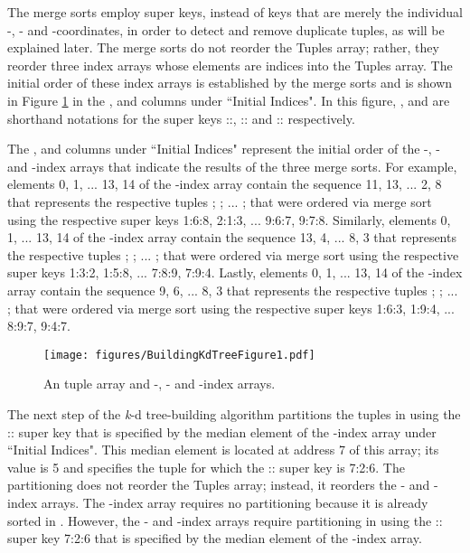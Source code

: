 \documentclass{sig-alternate}
\begin{document}
The merge sorts employ super keys, instead of keys that are merely the individual -, - and -coordinates, in order to detect and remove duplicate tuples, as will be explained later.  The merge sorts do not reorder the Tuples array; rather, they reorder three index arrays whose elements are indices into the Tuples array.  The initial order of these index arrays is established by the merge sorts and is shown in Figure \ref{fig:IndexArrays} in the ,  and  columns under ``Initial Indices".  In this figure, ,  and  are shorthand notations for the super keys ::, :: and :: respectively. 

The ,  and  columns under ``Initial Indices" represent the initial order of the -, - and -index arrays that indicate the results of the three merge sorts.  For example, elements 0, 1, ... 13, 14 of the -index array contain the sequence 11, 13, ... 2, 8 that represents the respective tuples ; ; ... ;  that were ordered via merge sort using the respective super keys 1:6:8, 2:1:3, ... 9:6:7, 9:7:8.  Similarly, elements 0, 1, ... 13, 14 of the -index array contain the sequence 13, 4, ... 8, 3 that represents the respective tuples ; ; ... ;  that were ordered via merge sort using the respective super keys 1:3:2, 1:5:8, ... 7:8:9, 7:9:4.  Lastly, elements 0, 1, ... 13, 14 of the -index array contain the sequence 9, 6, ... 8, 3 that represents the respective tuples ; ; ... ;  that were ordered via merge sort using the respective super keys 1:6:3, 1:9:4, ... 8:9:7, 9:4:7.

\begin{figure}[h]
\centering
\centerline{\texttt{[image: figures/BuildingKdTreeFigure1.pdf]}}
\caption{An  tuple array and -, - and -index arrays.}
\label{fig:IndexArrays}
\end{figure}

The next step of the \emph{k}-d tree-building algorithm partitions the  tuples in  using the :: super key that is specified by the median element of the -index array under ``Initial Indices".  This median element is located at address 7 of this array; its value is 5 and specifies the tuple  for which the :: super key is 7:2:6.  The partitioning does not reorder the Tuples array; instead, it reorders the - and -index arrays.  The -index array requires no partitioning because it is already sorted in .  However, the - and -index arrays require partitioning in  using the :: super key 7:2:6 that is specified by the median element of the -index array.
\end{document}
